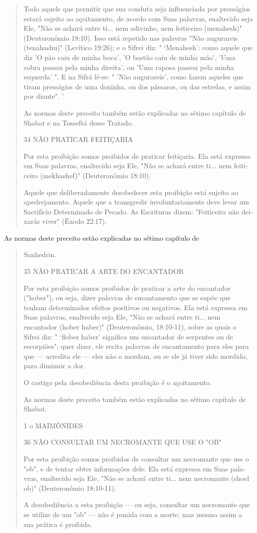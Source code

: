 \begin{quote}
Todo aquele que permitir que sua conduta seja influenciada por
pres­ságios estará sujeito ao açoitamento, de acordo com Suas palavras,
enaltecido seja Ele, "Não se achará entre ti... nem adivinho, nem
feiticeiro (menahesh)" (Deuteronômio 18:10). Isso está repetido nas
palavras "Não augurareis (tena­hashu)" (Levítico 19:26); e o Sifrei diz:
" `Menahesh': como aquele que diz 'O pão caiu de minha boca', 'O bastão
caiu de minha mão', 'Uma cobra passou pela minha direita', ou 'Uma
raposa passou pela minha esquerda' ". E na Sifrá lê-se: " 'Não
augurareis', como fazem aqueles que tiram presságios de uma do­ninha, ou
dos pássaros, ou das estrelas, e assim por diante". '

As normas deste preceito também estão explicadas no sétimo capí­tulo de
Shabat e na Tosseftá desse Tratado.

34 NÃO PRATICAR FEITIÇARIA

Por esta proibição somos proibidos de praticar feitiçaria. Ela está
ex­pressa em Suas palavras, enaltecido seja Ele, "Não se achará entre
ti... nem feiti­ceiro (mekhashef)" (Deuteronômio 18:10).

Aquele que deliberadamente desobedecer esta proibição está sujei­to ao
apedrejamento. Aquele que a transgredir involuntariamente deve levar um
Sacrifício Determinado de Pecado. As Escrituras dizem: "Feiticeira não
dei­xarás viver" (Êxodo 22:17).
\end{quote}

As normas deste preceito estão explicadas no sétimo capítulo de

\begin{quote}
Sanhedrin.

35 NÃO PRATICAR A ARTE DO ENCANTADOR

Por esta proibição somos proibidos de praticar a arte do encantador
("hober"), ou seja, dizer palavras de encantamento que se supõe que
tenham determinados efeitos positivos ou negativos. Ela está expressa em
Suas pala­vras, enaltecido seja Ele, "Não se achará entre ti... nem
encantador (hober ha­ber)" (Deuteronômio, 18:10-11), sobre as quais o
Sifrei diz: " `flober haber' significa um encantador de serpentes ou de
escorpiões"; quer dizer, ele recita palavras de encantamento para eles
para que --- acredita ele --- eles não o mor­dam, ou se ele já tiver
sido mordido, para diminuir a dor.

O castigo pela desobediência desta proibição é o açoitamento.

As normas deste preceito também estão explicadas no sétimo capí­tulo de
Shabat.

1 o MAIMÔNIDES

36 NÃO CONSULTAR UM NECROMANTE QUE USE O "OB"

Por esta proibição somos proibidos de consultar um necromante que use o
"ob", e de tentar obter informações dele. Ela está expressa em Suas
pala­vras, enaltecido seja Ele, "Não se achará entre ti... nem
necromante (shoel ob)" (Deuteronômio 18:10-11).

A desobediência a esta proibição --- ou seja, consultar um necromante
que se utilize de um "ob" --- não é punida com a morte, mas mesmo assim
a sua prática é proibida.
\end{quote}

